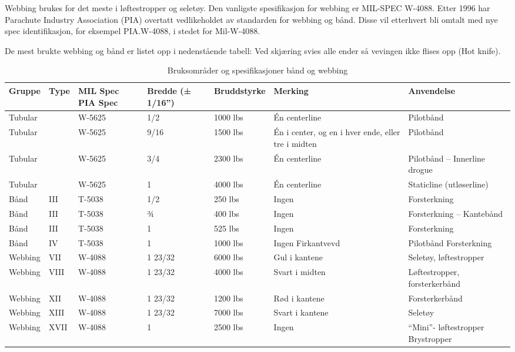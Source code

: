Webbing brukes for det meste i løftestropper og seletøy. Den vanligste spesifikasjon for webbing er MIL-SPEC W-4088. Etter 1996 har Parachute Industry Association (PIA) overtatt vedlikeholdet av standarden for webbing og bånd. Disse vil etterhvert bli omtalt med nye spec identifikasjon, for eksempel PIA.W-4088, i stedet for Mil-W-4088.

De mest brukte webbing og bånd er listet opp i nedenstående tabell: Ved skjæring svies alle ender så vevingen ikke flises opp (Hot knife).

\begin{table}
	\caption{Bruksområder og spesifikasjoner bånd og webbing}
	\begin{tabular}{ | l | l | l | l | l | l | l | }
		\hline
		Gruppe & Type & MIL Spec PIA Spec & Bredde (± 1/16'') & Bruddstyrke & Merking & Anvendelse \\
		\hline
		Tubular & & W-5625 & 1/2 & 1000 lbs & Én centerline & Pilotbånd \\
		\hline
		Tubular & & W-5625 & 9/16 & 1500 lbs & Én i center, og en i hver ende, eller tre i midten & Pilotbånd \\
		\hline
		Tubular & & W-5625 & 3/4 & 2300 lbs & Én centerline & Pilotbånd – Innerline drogue \\
		\hline
		Tubular & & W-5625 & 1 & 4000 lbs & Én centerline & Staticline (utløserline) \\
		\hline
		Bånd & III & T-5038 & 1/2 & 250 lbs & Ingen & Forsterkning \\
		\hline
		Bånd & III & T-5038 & 3⁄4 & 400 lbs & Ingen & Forsterkning – Kantebånd \\
		\hline
		Bånd & III & T-5038 & 1 & 525 lbs & Ingen & Forsterkning \\
		\hline
		Bånd & IV & T-5038 & 1 & 1000 lbs & Ingen Firkantvevd & Pilotbånd Forsterkning \\
		\hline
		Webbing & VII & W-4088 & 1 23/32 & 6000 lbs & Gul i kantene & Seletøy, løftestropper \\
		\hline
		Webbing & VIII & W-4088 & 1 23/32 & 4000 lbs & Svart i midten & Løftestropper, forsterkerbånd \\
		\hline
		Webbing & XII & W-4088 & 1 23/32 & 1200 lbs & Rød i kantene & Forsterkerbånd \\
		\hline
		Webbing & XIII & W-4088 & 1 23/32 & 7000 lbs & Svart i kantene & Seletøy \\
		\hline
		Webbing & XVII & W-4088 & 1 & 2500 lbs & Ingen & ``Mini''- løftestropper
		Brystropper \\		
		\hline
	\end{tabular}
\end{table}

